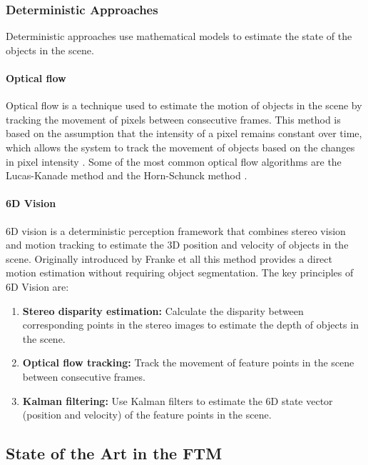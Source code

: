 \subsubsection{Deterministic Approaches}

Deterministic approaches use mathematical models to estimate the state of the objects in the scene. 

\paragraph{Optical flow}

Optical flow is a technique used to estimate the motion of objects in the scene by tracking the movement of pixels between consecutive frames.
This method is based on the assumption that the intensity of a pixel remains constant over time, which allows the system to track the movement
of objects based on the changes in pixel intensity \cite{optical_flow_estimation_survey}. Some of the most common optical flow algorithms are the 
Lucas-Kanade method \cite{flow_lucas_kanade} and the Horn-Schunck method \cite{flow_schunck}.

\paragraph{6D Vision}

6D vision is a deterministic perception framework that combines stereo vision and motion tracking to estimate the 3D position and velocity
of objects in the scene. Originally introduced by Franke et all \cite{6d_vision_daimler} this method provides a direct
motion estimation without requiring object segmentation. The key principles of 6D Vision are: 

\begin{enumerate}
  \item \textbf{Stereo disparity estimation:} Calculate the disparity between corresponding points in the stereo images to estimate the depth of objects in the scene.
  \item \textbf{Optical flow tracking:} Track the movement of feature points in the scene between consecutive frames.
  \item \textbf{Kalman filtering:} Use Kalman filters to estimate the 6D state vector (position and velocity) of the feature points in the scene.
\end{enumerate}




\subsection{State of the Art in the FTM}

